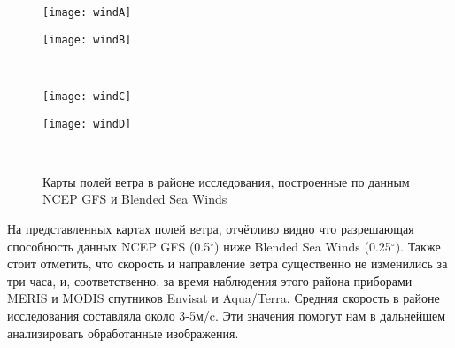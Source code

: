 \begin{figure}[H]
   	\centering
	\begin{minipage}{.47\textwidth}
	    \subcaptionbox{\label{fig:windA}}
		{\texttt{[image: windA]}}
	\end{minipage}
	\hfill
	\begin{minipage}{.47\textwidth}
	    \subcaptionbox{\label{fig:windB}}
		{\texttt{[image: windB]}}
	\end{minipage}
	\\
	\begin{minipage}{.47\textwidth}
	    \subcaptionbox{\label{fig:windC}}
		{\texttt{[image: windC]}}
	\end{minipage}
	\hfill
	\begin{minipage}{.47\textwidth}
	    \subcaptionbox{\label{fig:windD}}
		{\texttt{[image: windD]}}
	\end{minipage}
    \\
    \caption{Карты полей ветра в районе исследования, построенные по данным NCEP GFS и Blended Sea Winds}
    \label{fig:wind}
\end{figure}

На представленных картах полей ветра, отчётливо видно что разрешающая способность данных NCEP GFS (0.5${}^\circ$) ниже Blended Sea Winds (0.25${}^\circ$). Также стоит отметить, что скорость и направление ветра существенно не изменились за три часа, и, соответственно, за время наблюдения этого района приборами MERIS и MODIS спутников Envisat и Aqua/Terra. Средняя скорость в районе исследования составляла около 3-5м/c. Эти значения помогут нам в дальнейшем анализировать обработанные изображения.

